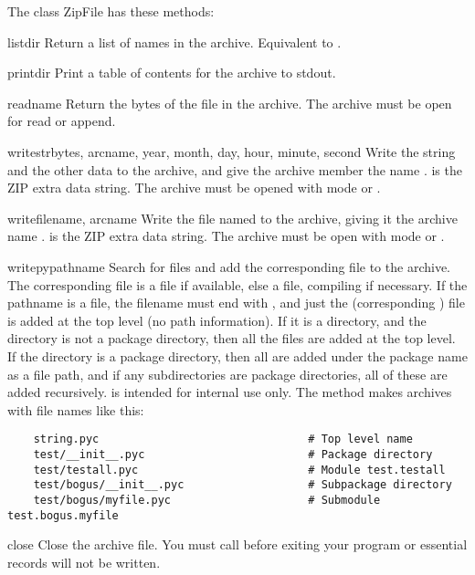 The class ZipFile has these methods: 

\begin{methoddesc}{listdir}{}
  Return a list of names in the archive.  Equivalent to
  .
\end{methoddesc}

\begin{methoddesc}{printdir}{}
  Print a table of contents for the archive to stdout. 
\end{methoddesc}

\begin{methoddesc}{read}{name}
  Return the bytes of the file in the archive.  The archive must be
  open for read or append.
\end{methoddesc}

\begin{methoddesc}{writestr}{bytes, arcname, year, month, day, hour,
                             minute, second}
  Write the string  and the other data to the archive, and
  give the archive member the name .   is the
  ZIP extra data string.  The archive must be opened with mode
   or .
\end{methoddesc}

\begin{methoddesc}{write}{filename, arcname}
  Write the file named  to the archive, giving it the
  archive name .   is the ZIP extra data
  string.  The archive must be open with mode  or
  .
\end{methoddesc}

\begin{methoddesc}{writepy}{pathname}
  Search for files  and add the corresponding file to the
  archive.  The corresponding file is a  file if
  available, else a  file, compiling if necessary.  If the
  pathname is a file, the filename must end with , and just
  the (corresponding ) file is added at the top level
  (no path information).  If it is a directory, and the directory is
  not a package directory, then all the files  are
  added at the top level.  If the directory is a package directory,
  then all  are added under the package name as a file
  path, and if any subdirectories are package directories, all of
  these are added recursively.   is intended for
  internal use only.  The  method makes archives
  with file names like this:

\begin{verbatim}
    string.pyc                                # Top level name 
    test/__init__.pyc                         # Package directory 
    test/testall.pyc                          # Module test.testall
    test/bogus/__init__.pyc                   # Subpackage directory 
    test/bogus/myfile.pyc                     # Submodule test.bogus.myfile
\end{verbatim}
\end{methoddesc}

\begin{methoddesc}{close}{}
  Close the archive file.  You must call  before
  exiting your program or essential records will not be written. 
\end{methoddesc}
